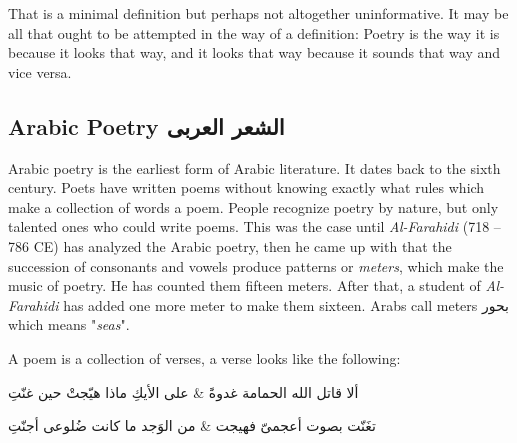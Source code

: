 \documentclass[12pt]{report}
\begin{document}
That is a minimal definition but perhaps not altogether uninformative. It may be all that ought to be attempted in the way of a definition: Poetry is the way it is because it looks that way, and it looks that way because it sounds that way and vice versa.



\subsection*{Arabic Poetry \textarabic{الشعر العربى}}
Arabic poetry is the earliest form of Arabic literature. It dates back to the sixth century. Poets have written poems without knowing exactly what rules which make a collection of words a poem. People recognize poetry by nature, but only talented ones who could write poems. %
This was the case until \textit{Al-Farahidi} (718 – 786 CE) has analyzed the
Arabic poetry, then he came up with that the succession of consonants and vowels
produce patterns or \textit{meters}, which make the music of poetry.  He has
counted them fifteen meters.  After that, a student of \textit{Al-Farahidi} has
added one more meter to make them sixteen. Arabs call meters \textarabic{بحور}
which means "\textit{seas}".

\bigskip

A poem is a collection of verses, a verse looks like the following:%

\vspace{0.5cm}
\begin{Arabic}
  \begin{traditionalpoem*}

    ألا قاتل الله الحمامة غدوةً \quad & \quad على الأيكِ ماذا هيّجتْ حين غنّتِ

    تغَنّت بصوت أعجمىّ فهيجت  \quad & \quad من الوَجد ما كانت ضُلوعى أجنّتِ
  \end{traditionalpoem*}
\end{Arabic}%
\vspace{0.5cm}
\end{document}
